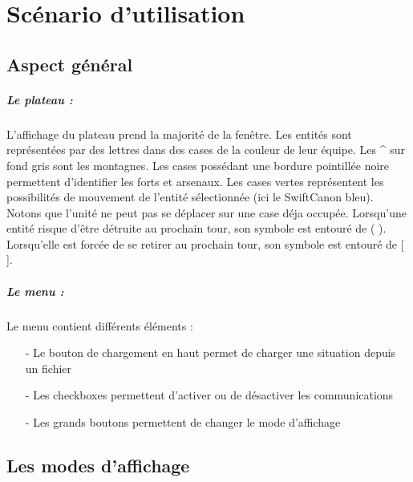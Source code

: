 \chapter{Scénario d'utilisation}

	\section{Aspect général}

		\paragraph{Le plateau :}
			L'affichage du plateau prend la majorité de la fenêtre.
			Les entités sont représentées par des lettres dans des cases de la couleur de leur équipe.
			Les \^{} sur fond gris sont les montagnes.
			Les cases possédant une bordure pointillée noire permettent d'identifier les forts et arsenaux.
			Les cases vertes représentent les possibilités de mouvement	de l'entité sélectionnée (ici le SwiftCanon bleu). 
			Notons que l'unité ne peut pas se déplacer sur une case déja occupée.
			Lorsqu'une entité risque d'être détruite au prochain tour, son symbole est entouré de ( ).
			Lorsqu'elle est forcée de se retirer au prochain tour, son symbole est entouré de [ ].
	
		\paragraph{Le menu :}
	
			Le menu contient différents éléments :
			\begin{itemize}
			\item[-]Le bouton de chargement en haut permet de charger une situation depuis un fichier
			\item[-]Les checkboxes permettent d'activer ou de désactiver les communications
			\item[-]Les grands boutons permettent de changer le mode d'affichage
			\end{itemize}

	\section{Les modes d'affichage}

